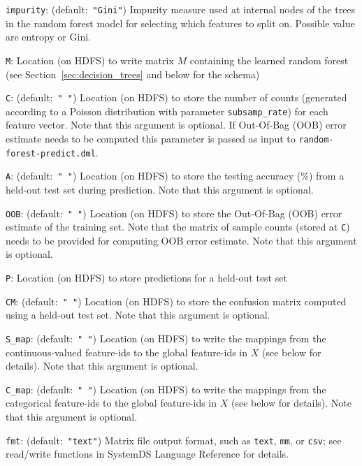 \begin{Description}
	\item[{\tt impurity}:] (default:\mbox{ }{\tt "Gini"})
	Impurity measure used at internal nodes of the trees in the random forest model for selecting which features to split on. Possible value are entropy or Gini.
	\item[{\tt M}:] 
	Location (on HDFS) to write matrix $M$ containing the learned random forest (see Section~\ref{sec:decision_trees} and below for the schema) 
	\item[{\tt C}:] (default:\mbox{ }{\tt " "})
	Location (on HDFS) to store the number of counts (generated according to a Poisson distribution with parameter {\tt subsamp\_rate}) for each feature vector. Note that this argument is optional. If Out-Of-Bag (OOB) error estimate needs to be computed this parameter is passed as input to {\tt random-forest-predict.dml}. 
	\item[{\tt A}:] (default:\mbox{ }{\tt " "})
	Location (on HDFS) to store the testing accuracy (\%) from a 
	held-out test set during prediction. Note that this argument is optional.
	\item[{\tt OOB}:] (default:\mbox{ }{\tt " "})
	Location (on HDFS) to store the Out-Of-Bag (OOB) error estimate of the training set. Note that the matrix of sample counts (stored at {\tt C}) needs to be provided for computing OOB error estimate. Note that this argument is optional.
	\item[{\tt P}:] 
	Location (on HDFS) to store predictions for a held-out test set
	\item[{\tt CM}:] (default:\mbox{ }{\tt " "})
	Location (on HDFS) to store the confusion matrix computed using a held-out test set. Note that this argument is optional.
	\item[{\tt S\_map}:] (default:\mbox{ }{\tt " "})
	Location (on HDFS) to write the mappings from the continuous-valued feature-ids to the global feature-ids in $X$ (see below for details). Note that this argument is optional.
	\item[{\tt C\_map}:] (default:\mbox{ }{\tt " "})
	Location (on HDFS) to write the mappings from the categorical feature-ids to the global feature-ids in $X$ (see below for details). Note that this argument is optional.
	\item[{\tt fmt}:] (default:\mbox{ }{\tt "text"})
	Matrix file output format, such as {\tt text}, {\tt mm}, or {\tt csv};
	see read/write functions in SystemDS Language Reference for details.
\end{Description}


 \smallskip

